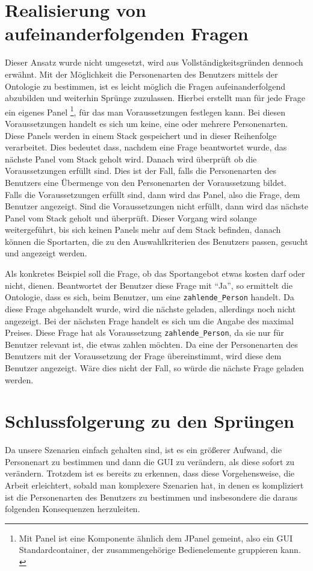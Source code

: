 \section{Realisierung von aufeinanderfolgenden Fragen}
Dieser Ansatz wurde nicht umgesetzt, wird aus Vollständigkeitsgründen dennoch erwähnt. Mit der Möglichkeit die Personenarten des Benutzers mittels der Ontologie zu bestimmen, ist es leicht möglich die Fragen aufeinanderfolgend abzubilden und weiterhin Sprünge zuzulassen. Hierbei erstellt man für jede Frage ein eigenes Panel \footnote{Mit Panel ist eine Komponente ähnlich dem JPanel gemeint, also ein GUI Standardcontainer, der zusammengehörige Bedienelemente gruppieren kann. \autocite{petri:jpanel}}, für das man Voraussetzungen festlegen kann. Bei diesen Voraussetzungen handelt es sich um keine, eine oder mehrere Personenarten. Diese Panels werden in einem Stack gespeichert und in dieser Reihenfolge verarbeitet. Dies bedeutet dass, nachdem eine Frage beantwortet wurde, das nächste Panel vom Stack geholt wird. Danach wird überprüft ob die Voraussetzungen erfüllt sind. Dies ist der Fall, falls die Personenarten des Benutzers eine Übermenge von den Personenarten der Voraussetzung bildet. \\
Falls die Voraussetzungen erfüllt sind, dann wird das Panel, also die Frage, dem Benutzer angezeigt. Sind die Voraussetzungen nicht erfüllt, dann wird das nächste Panel vom Stack geholt und überprüft. Dieser Vorgang wird solange weitergeführt, bis sich keinen Panels mehr auf dem Stack befinden, danach können die Sportarten, die zu den Auswahlkriterien des Benutzers passen, gesucht und angezeigt werden.

Als konkretes Beispiel soll die Frage, ob das Sportangebot etwas kosten darf oder nicht, dienen. Beantwortet der Benutzer diese Frage mit "`Ja"', so ermittelt die Ontologie, dass es sich, beim Benutzer, um eine \lstinline[language=OWL]"zahlende_Person" handelt. Da diese Frage abgehandelt wurde, wird die nächste geladen, allerdings noch nicht angezeigt. Bei der nächsten Frage handelt es sich um die Angabe des maximal Preises. Diese Frage hat als Voraussetzung \lstinline[language=OWL]"zahlende_Person", da sie nur für Benutzer relevant ist, die etwas zahlen möchten. Da eine der Personenarten des Benutzers mit der Voraussetzung der Frage übereinstimmt, wird diese dem Benutzer angezeigt. Wäre dies nicht der Fall, so würde die nächste Frage geladen werden.

\section{Schlussfolgerung zu den Sprüngen}
Da unsere Szenarien einfach gehalten sind, ist es ein größerer Aufwand, die Personenart zu bestimmen und dann die GUI zu verändern, als diese sofort zu verändern. Trotzdem ist es bereits zu erkennen, dass diese Vorgehensweise, die Arbeit erleichtert, sobald man komplexere Szenarien hat, in denen es kompliziert ist die Personenarten des Benutzers zu bestimmen und insbesondere die daraus folgenden Konsequenzen herzuleiten.